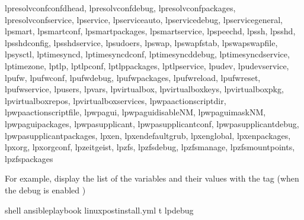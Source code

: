\documentclass[letterpaper,10pt,english]{sphinxmanual}
\begin{document}
\begin{sphinxVerbatim}[commandchars=\\\{\}]
 lp\PYGZus{}resolvconf\PYGZus{}confd\PYGZus{}head, lp\PYGZus{}resolvconf\PYGZus{}debug, lp\PYGZus{}resolvconf\PYGZus{}packages,
 lp\PYGZus{}resolvconf\PYGZus{}service, lp\PYGZus{}service, lp\PYGZus{}service\PYGZus{}auto, lp\PYGZus{}service\PYGZus{}debug,
 lp\PYGZus{}service\PYGZus{}general, lp\PYGZus{}smart, lp\PYGZus{}smart\PYGZus{}conf, lp\PYGZus{}smart\PYGZus{}packages, lp\PYGZus{}smart\PYGZus{}service,
 lp\PYGZus{}speechd, lp\PYGZus{}ssh, lp\PYGZus{}sshd, lp\PYGZus{}sshd\PYGZus{}config, lp\PYGZus{}sshd\PYGZus{}service, lp\PYGZus{}sudoers, lp\PYGZus{}swap,
 lp\PYGZus{}swap\PYGZus{}fstab, lp\PYGZus{}swap\PYGZus{}swapfile, lp\PYGZus{}sysctl, lp\PYGZus{}timesyncd, lp\PYGZus{}timesyncd\PYGZus{}conf,
 lp\PYGZus{}timesyncd\PYGZus{}debug, lp\PYGZus{}timesyncd\PYGZus{}service, lp\PYGZus{}timezone, lp\PYGZus{}tlp, lp\PYGZus{}tlp\PYGZus{}conf,
 lp\PYGZus{}tlp\PYGZus{}packages, lp\PYGZus{}tlp\PYGZus{}service, lp\PYGZus{}udev, lp\PYGZus{}udev\PYGZus{}service, lp\PYGZus{}ufw, lp\PYGZus{}ufw\PYGZus{}conf,
 lp\PYGZus{}ufw\PYGZus{}debug, lp\PYGZus{}ufw\PYGZus{}packages, lp\PYGZus{}ufw\PYGZus{}reload, lp\PYGZus{}ufw\PYGZus{}reset, lp\PYGZus{}ufw\PYGZus{}service,
 lp\PYGZus{}users, lp\PYGZus{}vars, lp\PYGZus{}virtualbox, lp\PYGZus{}virtualbox\PYGZus{}keys, lp\PYGZus{}virtualbox\PYGZus{}pkg,
 lp\PYGZus{}virtualbox\PYGZus{}repos, lp\PYGZus{}virtualbox\PYGZus{}services, lp\PYGZus{}wpa\PYGZus{}action\PYGZus{}script\PYGZus{}dir,
 lp\PYGZus{}wpa\PYGZus{}action\PYGZus{}script\PYGZus{}file, lp\PYGZus{}wpagui, lp\PYGZus{}wpagui\PYGZus{}disableNM, lp\PYGZus{}wpagui\PYGZus{}mask\PYGZus{}NM,
 lp\PYGZus{}wpagui\PYGZus{}packages, lp\PYGZus{}wpasupplicant, lp\PYGZus{}wpasupplicant\PYGZus{}conf, lp\PYGZus{}wpasupplicant\PYGZus{}debug,
 lp\PYGZus{}wpasupplicant\PYGZus{}packages, lp\PYGZus{}xen, lp\PYGZus{}xen\PYGZus{}default\PYGZus{}grub, lp\PYGZus{}xen\PYGZus{}global,
 lp\PYGZus{}xen\PYGZus{}packages, lp\PYGZus{}xorg, lp\PYGZus{}xorg\PYGZus{}conf, lp\PYGZus{}zeitgeist, lp\PYGZus{}zfs, lp\PYGZus{}zfs\PYGZus{}debug,
 lp\PYGZus{}zfs\PYGZus{}manage, lp\PYGZus{}zfs\PYGZus{}mountpoints, lp\PYGZus{}zfs\PYGZus{}packages\PYG{o}{]}
\end{sphinxVerbatim}
\sphinxresetverbatimhllines

For example, display the list of the variables and their values with
the tag  (when the debug is enabled )

%
\begin{sphinxVerbatim}[commandchars=\\\{\}]
 shell\PYGZgt{} ansible\PYGZhy{}playbook linux\PYGZus{}postinstall.yml \PYGZhy{}t lp\PYGZus{}debug
\end{sphinxVerbatim}
\sphinxresetverbatimhllines
\end{document}
